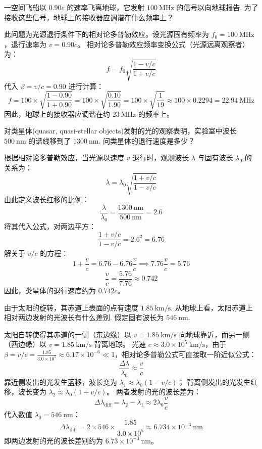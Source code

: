 \begin{exercise}\label{ex:9.5}
一空间飞船以 $0.90c$ 的速率飞离地球，它发射 $100 \ \mathrm{MHz}$ 的信号以向地球报告. 为了接收这些信号，地球上的接收器应调谐在什么频率上？
\end{exercise}
\begin{solution}
此问题为光源退行条件下的相对论多普勒效应。设光源固有频率为 $f_0 = 100 \ \mathrm{MHz}$，退行速率为 $v = 0.90c$。
相对论多普勒效应频率变换公式（光源远离观察者）为：
$$ f = f_0 \sqrt{\frac{1 - v/c}{1 + v/c}} $$
代入 $\beta = v/c = 0.90$ 进行计算：
$$ f = 100 \times \sqrt{\frac{1 - 0.90}{1 + 0.90}} = 100 \times \sqrt{\frac{0.10}{1.90}} = 100 \times \sqrt{\frac{1}{19}} \approx 100 \times 0.2294 = 22.94 \ \mathrm{MHz} $$
因此，地球上的接收器应调谐在约 $23 \ \mathrm{MHz}$ 的频率上。
\end{solution}

\begin{exercise}\label{ex:9.6}
对类星体(quasar, quasi-stellar objects)发射的光的观察表明，实验室中波长 $500 \ \mathrm{nm}$ 的谱线移到了 $1300 \ \mathrm{nm}$. 问类星体的退行速度是多少？
\end{exercise}
\begin{solution}
根据相对论多普勒效应，当光源以速度 $v$ 退行时，观测波长 $\lambda$ 与固有波长 $\lambda_0$ 的关系为：
$$ \lambda = \lambda_0 \sqrt{\frac{1 + v/c}{1 - v/c}} $$
由此定义波长红移的比例：
$$ \frac{\lambda}{\lambda_0} = \frac{1300 \ \mathrm{nm}}{500 \ \mathrm{nm}} = 2.6 $$
将其代入公式，对两边平方：
$$ \frac{1 + v/c}{1 - v/c} = 2.6^2 = 6.76 $$
解关于 $v/c$ 的方程：
$$ 1 + \frac{v}{c} = 6.76 - 6.76 \frac{v}{c} \implies 7.76 \frac{v}{c} = 5.76 $$
$$ \frac{v}{c} = \frac{5.76}{7.76} \approx 0.742 $$
因此，类星体的退行速度约为 $0.742c$。
\end{solution}

\begin{exercise}\label{ex:9.7}
由于太阳的旋转，其赤道上表面的点有速度 $1.85 \ \mathrm{km/s}$. 从地球上看，太阳赤道上相对两边发射的光波长有什么差别. 假定固有波长为 $546 \ \mathrm{nm}$.
\end{exercise}
\begin{solution}
太阳自转使得其赤道的一侧（东边缘）以 $v = 1.85 \ \mathrm{km/s}$ 向地球靠近，而另一侧（西边缘）以 $v = 1.85 \ \mathrm{km/s}$ 背离地球。
光速 $c \approx 3.0 \times 10^5 \ \mathrm{km/s}$，由于 $\beta = v/c = \frac{1.85}{3.0 \times 10^5} \approx 6.17 \times 10^{-6} \ll 1$，相对论多普勒公式可直接取一阶近似公式：
$$ \frac{\Delta \lambda}{\lambda_0} \approx \frac{v}{c} $$
靠近侧发出的光发生蓝移，波长变为 $\lambda_1 \approx \lambda_0 (1 - v/c)$；
背离侧发出的光发生红移，波长变为 $\lambda_2 \approx \lambda_0 (1 + v/c)$。
两者发射的光的波长差为：
$$ \Delta \lambda_{\text{diff}} = \lambda_2 - \lambda_1 \approx 2 \lambda_0 \frac{v}{c} $$
代入数值 $\lambda_0 = 546 \ \mathrm{nm}$：
$$ \Delta \lambda_{\text{diff}} = 2 \times 546 \times \frac{1.85}{3.0 \times 10^5} \approx 6.734 \times 10^{-3} \ \mathrm{nm} $$
即两边发射的光的波长差别约为 $6.73 \times 10^{-3} \ \mathrm{nm}$。
\end{solution}

